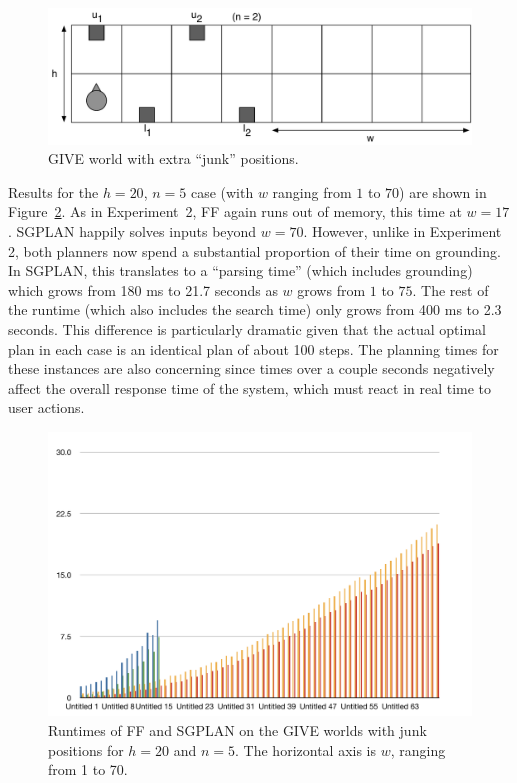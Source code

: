 \begin{figure}
  \centering
  \includegraphics[width=1\columnwidth]{pic-empty-buttons}
  \caption{GIVE world with extra ``junk'' positions.}
  \label{fig:give-junk}
\end{figure}

Results for the $h=20$, $n=5$ case (with $w$ ranging from $1$ to $70$) are
shown in Figure~\ref{fig:give-runtime-junk}. As in Experiment~2, FF again
runs out of memory, this time at $w=17$. SGPLAN happily solves inputs
beyond $w=70$. However, unlike in Experiment 2, both planners now spend a
substantial proportion of their time on grounding. In SGPLAN, this
translates to a ``parsing time'' (which  includes
grounding) which grows from 180 ms to 21.7 seconds as $w$ grows from $1$ to
$75$. The rest of the runtime (which also includes the search time) only
grows from 400 ms to 2.3 seconds. This difference is particularly dramatic
given that the actual optimal plan in each case is an identical plan of
about 100 steps. The planning times for these instances are also concerning
since times over a couple seconds negatively affect the overall response
time of the system, which must react in real time to user actions.

\begin{figure}
  \centering
  \includegraphics[width=1\columnwidth]{pic-runtime-empty-world}
  \caption{Runtimes of FF and SGPLAN on the GIVE worlds with junk
    positions for $h=20$ and $n=5$. The horizontal axis is $w$,
    ranging from 1 to 70.}
  \label{fig:give-runtime-junk}
\end{figure}


